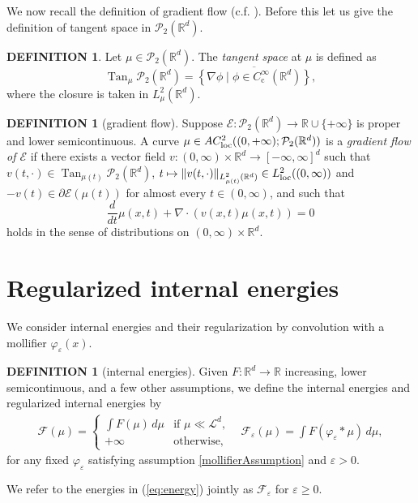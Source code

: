 \documentclass[11pt,leqno]{amsart}
\theoremstyle{definition}
\newtheorem{defi}[thm]{DEFINITION}
\newcommand{\bes}{\begin{equation*}}
\newcommand{\ees}{\end{equation*}}
\newcommand{\R}{{\mathord{\mathbb R}}}
\newcommand{\Rd}{{\mathord{\mathbb R}^d}}
\newcommand{\loc}{{\rm loc}}
\newcommand{\grad}{\nabla}
\newcommand{\F}{\mathcal{F}}
\def\P{{\mathcal P}}
\def\epsilon{\varepsilon}
\def\e{\varepsilon}
\newcommand{\E}{\mathcal{E}}
\def\F{\mathcal{F}}
\DeclareMathOperator{\Tan}{Tan}
\begin{document}
We now recall the definition of gradient flow (c.f. \cite[Proposition 8.3.1, Definition 11.1.1]{AGS}). Before this let us give the definition of tangent space in $\P_2(\R^d)$.
\begin{defi}
	Let $\mu \in \P_2(\R^d)$. The \emph{tangent space} at $\mu$ is defined as
\bes
	\Tan_\mu \P_2(\R^d) = \overline{\left\{ \grad\phi \mid \phi \in C_\mathrm{c}^\infty(\R^d) \right\}},
\ees
where the closure is taken in $L^2_\mu(\R^d)$.
\end{defi}

\begin{defi}[gradient flow] \label{gradientflowdef}
	Suppose $\E\colon \P_2(\Rd) \to \R \cup \{+\infty\}$ is proper and lower semicontinuous. A curve $\mu \in AC^2_\loc((0,+\infty); \P_2(\Rd))$ is a \emph{gradient flow of $\E$} if there exists a vector field $v\colon (0,\infty)\times \R^d \to [-\infty,\infty]^d$ such that $v(t,\cdot)\in\Tan_{\mu(t)}\P_2(\R^d)$, $t\mapsto \|v(t,\cdot)\|_{L^2_{\mu(t)}(\R^d)} \in L^2_\loc((0,\infty))$ and $- v(t) \in \partial \E(\mu(t))$ for almost every $t\in(0,\infty)$, and such that 
\[ 
	\frac{d}{dt} \mu(x,t) + \grad \cdot (v(x,t) \mu(x,t)) = 0 
\]
holds in the sense of distributions on $(0,\infty)\times\R^d$.
\end{defi}

\section{Regularized internal energies}
We consider internal energies and their regularization by convolution with a mollifier $\varphi_\e(x)$.
\begin{defi}[internal energies] \label{energy def} Given $F:\Rd \to \R$ increasing, lower semicontinuous, and {\color{Aquamarine} a few other assumptions}, we define the internal energies and regularized internal energies by
\begin{align}
 \label{eq:energy}
	\F(\mu) = \begin{cases} \int F(\mu) \,d\mu & \mbox{if $\mu \ll \mathcal{L}^d$,} \\ +\infty & \mbox{otherwise,} \end{cases} \quad  \F_\e(\mu) =  \int F(\varphi_\e * \mu) \, d\mu ,
\end{align}
for any fixed $\varphi_\e$ satisfying assumption \ref{mollifierAssumption} and $\epsilon >0$.
\end{defi}
We refer to the energies in (\ref{eq:energy}) jointly  as $\F_\e$ for $\e \geq 0$.
\end{document}
